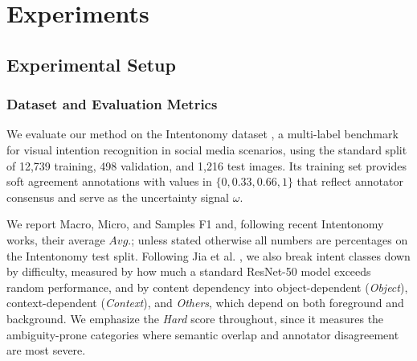 \section{Experiments}
\label{sec:experiments}

\subsection{Experimental Setup}

\subsubsection{Dataset and Evaluation Metrics}
We evaluate our method on the Intentonomy dataset \cite{jia_intentonomy_2021}, a multi-label benchmark for visual intention recognition in social media scenarios, using the standard split of 12,739 training, 498 validation, and 1,216 test images. Its training set provides soft agreement annotations with values in $\{0, 0.33, 0.66, 1\}$ that reflect annotator consensus and serve as the uncertainty signal $\omega$.

We report Macro, Micro, and Samples F1 and, following recent Intentonomy works, their average $\textit{Avg.}$; unless stated otherwise all numbers are percentages on the Intentonomy test split. Following Jia et al. \cite{jia_intentonomy_2021}, we also break intent classes down by difficulty, measured by how much a standard ResNet-50 model exceeds random performance, and by content dependency into object-dependent ({\itshape Object}), context-dependent ({\itshape Context}), and {\itshape Others}, which depend on both foreground and background. We emphasize the \textit{Hard} score throughout, since it measures the ambiguity-prone categories where semantic overlap and annotator disagreement are most severe.

